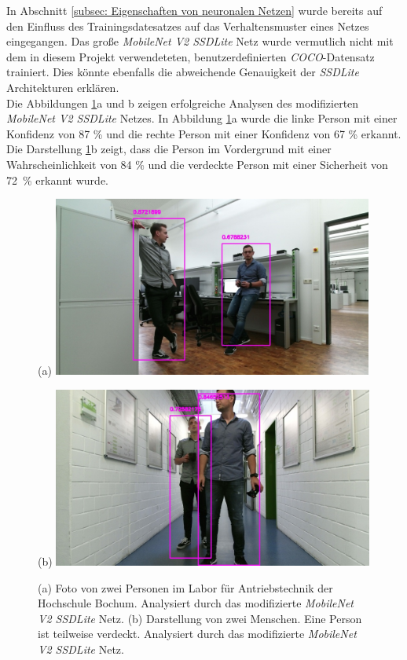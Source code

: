 In Abschnitt \ref{subsec: Eigenschaften von neuronalen Netzen} wurde bereits auf den Einfluss des Trainingsdatesatzes auf das Verhaltensmuster eines Netzes eingegangen. Das große \textit{MobileNet V2 SSDLite} Netz wurde vermutlich nicht mit dem in diesem Projekt verwendeteten, benutzerdefinierten \textit{COCO}-Datensatz trainiert. Dies könnte ebenfalls die abweichende Genauigkeit der \textit{SSDLite} Architekturen erklären.\\


Die Abbildungen \ref{fig: owndatat}a und b zeigen erfolgreiche Analysen des modifizierten \textit{MobileNet V2 SSDLite} Netzes. In Abbildung \ref{fig: owndatat}a wurde die linke Person mit einer Konfidenz von 87 \% und die rechte Person mit einer Konfidenz von 67 \% erkannt. Die Darstellung \ref{fig: owndatat}b zeigt, dass die Person im Vordergrund mit einer Wahrscheinlichkeit von 84 \% und die verdeckte Person mit einer Sicherheit von {72~\%} erkannt wurde.  \\

	\begin{figure}[H]
	\centering
	\begin{minipage}[b]{0.49\textwidth}
		(a)
		\includegraphics[width=0.94\textwidth]{Bilder/26t.jpg}
	\end{minipage}
	\hfill
	\begin{minipage}[b]{0.49\textwidth}
		(b)
		\includegraphics[width=0.94\textwidth]{Bilder/39t.jpg}
	\end{minipage}
	\caption{(a) Foto von zwei Personen im Labor für Antriebstechnik der Hochschule Bochum. Analysiert durch das modifizierte \textit{MobileNet V2 SSDLite} Netz. (b) Darstellung von zwei Menschen. Eine Person ist teilweise verdeckt. Analysiert durch das modifizierte \textit{MobileNet V2 SSDLite} Netz.}
	\label{fig: owndatat}
\end{figure}




